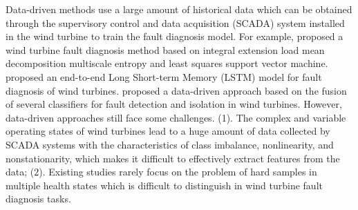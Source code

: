 \documentclass[lettersize,journal]{IEEEtran}
\begin{document}
Data-driven methods use a large amount of historical data which can be obtained through the supervisory control and data acquisition (SCADA) system installed in the wind turbine to train the fault diagnosis model. For example, \citet{gao2018novel} proposed a wind turbine fault diagnosis method based on integral extension load mean decomposition multiscale entropy and least squares support vector machine.  \citet{lei2019fault} proposed an end-to-end Long Short-term Memory (LSTM) model for fault diagnosis of wind turbines. \citet{pashazadeh2018data} proposed a data-driven approach based on the fusion of several classifiers for fault detection and isolation in wind turbines. However, data-driven approaches still face some challenges. (1). The complex and variable operating states of wind turbines lead to a huge amount of data collected by SCADA systems with the characteristics of class imbalance, nonlinearity, and nonstationarity, which makes it difficult to effectively extract features from the data; (2). Existing studies rarely focus on the problem of hard samples in multiple health states which is difficult to distinguish in wind turbine fault diagnosis tasks.


\end{document}
